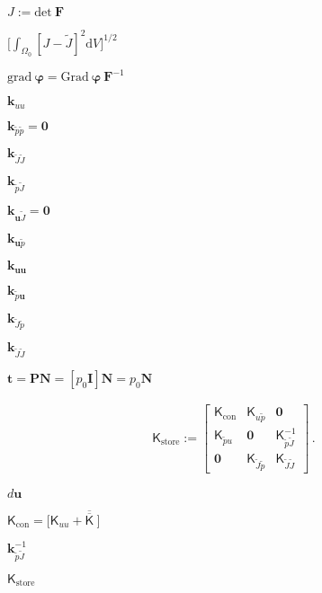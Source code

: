 \documentclass{article}
\begin{document}
$J := \textrm{det}\ \mathbf{F}$
\pagebreak

$ \bigl[ \int_{\Omega_0} {[ J - \widetilde{J}]}^{2}\textrm{d}V \bigr]^{1/2}$
\pagebreak

$\textrm{grad}\ \boldsymbol{\varphi} = \textrm{Grad}\ \boldsymbol{\varphi} \ \mathbf{F}^{-1}$
\pagebreak

$\mathsf{\mathbf{k}}_{uu}$
\pagebreak

$\mathsf{\mathbf{k}}_{\widetilde{p} \widetilde{p}} = \mathbf{0}$
\pagebreak

$\mathsf{\mathbf{k}}_{\widetilde{J} \widetilde{J}}$
\pagebreak

$\mathsf{\mathbf{k}}_{\widetilde{p} \widetilde{J}}$
\pagebreak

$\mathsf{\mathbf{k}}_{\mathbf{u} \widetilde{J}} = \mathbf{0}$
\pagebreak

$\mathsf{\mathbf{k}}_{\mathbf{u} \widetilde{p}}$
\pagebreak

$\mathsf{\mathbf{k}}_{\mathbf{u} \mathbf{u}}$
\pagebreak

$\mathsf{\mathbf{k}}_{ \widetilde{p} \mathbf{u}}$
\pagebreak

$\mathsf{\mathbf{k}}_{ \widetilde{J} \widetilde{p}}$
\pagebreak

$\mathsf{\mathbf{k}}_{ \widetilde{J} \widetilde{J}}$
\pagebreak

$\mathbf{t} = \mathbf{P}\mathbf{N} = [p_0 \mathbf{I}] \mathbf{N} = p_0 \mathbf{N}$
\pagebreak

\begin{align*} \mathbf{\mathsf{K}}_{\textrm{store}} := \begin{bmatrix} \mathbf{\mathsf{K}}_{\textrm{con}} & \mathbf{\mathsf{K}}_{u\widetilde{p}} & \mathbf{0} \\ \mathbf{\mathsf{K}}_{\widetilde{p}u} & \mathbf{0} & \mathbf{\mathsf{K}}_{\widetilde{p}\widetilde{J}}^{-1} \\ \mathbf{0} & \mathbf{\mathsf{K}}_{\widetilde{J}\widetilde{p}} & \mathbf{\mathsf{K}}_{\widetilde{J}\widetilde{J}} \end{bmatrix} \, . \end{align*}
\pagebreak

$d\mathbf{u}$
\pagebreak

$\mathbf{\mathsf{K}}_{\textrm{con}} = \bigl[ \mathbf{\mathsf{K}}_{uu} + \overline{\overline{\mathbf{\mathsf{K}}}}~ \bigr]$
\pagebreak

$\mathsf{\mathbf{k}}^{-1}_{\widetilde{p} \widetilde{J}}$
\pagebreak

$\mathbf{\mathsf{K}}_{\textrm{store}}$
\pagebreak
\end{document}
